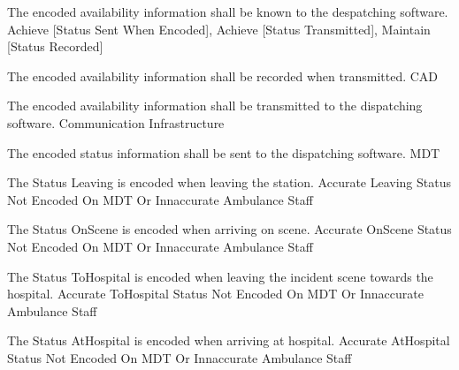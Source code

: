   \startkaosspec
  	 {The encoded availability information shall be known to the despatching software.}
  	 {Achieve [Status Sent When Encoded], Achieve [Status Transmitted], Maintain [Status Recorded]}
  \stopkaosspec

  \startkaosspec
  	 {The encoded availability information shall be recorded when transmitted.}
  	 {CAD}
  \stopkaosspec

  \startkaosspec
  	 {The encoded availability information shall be transmitted to the dispatching software.}
  	 {Communication Infrastructure}
  \stopkaosspec

  \startkaosspec
  	 {The encoded status information shall be sent to the dispatching software.}
  	 {MDT}
  \stopkaosspec
  
  
    {}

  \startkaosspec
  	 {The Status Leaving is encoded when leaving the station.}
  	 {Accurate Leaving Status Not Encoded On MDT Or Innaccurate}
  	 {Ambulance Staff}
  \stopkaosspec

  \startkaosspec
  	 {The Status OnScene is encoded when arriving on scene.}
  	 {Accurate OnScene Status Not Encoded On MDT Or Innaccurate}
  	 {Ambulance Staff}
  \stopkaosspec

  \startkaosspec
  	 {The Status ToHospital is encoded when leaving the incident scene towards the hospital.}
  	 {Accurate ToHospital Status Not Encoded On MDT Or Innaccurate}
  	 {Ambulance Staff}
  \stopkaosspec

  \startkaosspec
  	 {The Status AtHospital is encoded when arriving at hospital.}
  	 {Accurate AtHospital Status Not Encoded On MDT Or Innaccurate}
  	 {Ambulance Staff}
  \stopkaosspec

